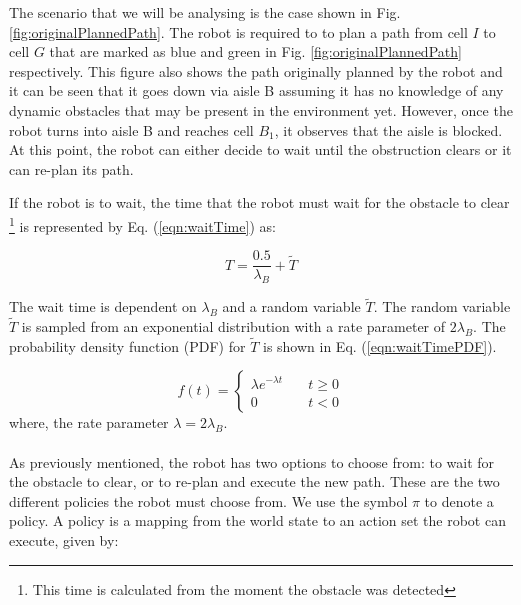 \documentclass[a4paper,12pt]{article}
\begin{document}
			The scenario that we will be analysing is the case shown in Fig. \ref{fig:originalPlannedPath}. The robot is required to to plan a path from cell $I$ to cell $G$ that are marked as blue and green in Fig. \ref{fig:originalPlannedPath} respectively. This figure also shows the path originally planned by the robot and it can be seen that it goes down via aisle B assuming it has no knowledge of any dynamic obstacles that may be present in the environment yet. However, once the robot turns into aisle B and reaches cell $ B_1 $, it observes that the aisle is blocked. At this point, the robot can either decide to wait until the obstruction clears or it can re-plan its path. 
			
			If the robot is to wait, the time that the robot must wait for the obstacle to clear \footnote{This time is calculated from the moment the obstacle was detected} is represented by Eq. (\ref{eqn:waitTime}) as: 
			
			\begin{equation}
			T=\frac{0.5}{\lambda_{B}}+\widetilde{T}
			\label{eqn:waitTime}
			\end{equation}
			
			The wait time is dependent on $\lambda_{B}$ and a random variable $\widetilde{T}$. The random variable $\widetilde{T}$ is sampled from an exponential distribution with a rate parameter of $2\lambda_{B}$. The probability density function (PDF) for $\widetilde{T}$ is shown in Eq. (\ref{eqn:waitTimePDF}). 
			
			\begin{equation}
			f(t) = 
			\begin{cases}
			\lambda e^{-\lambda t} & \quad t \geq 0 \\
			0 & \quad t < 0
			\end{cases}
			\label{eqn:waitTimePDF}
			\end{equation}
			where, the rate parameter $\lambda = 2\lambda_{B}$. 
			\\
			\\
			As previously mentioned, the robot has two options to choose from: to wait for the obstacle to clear, or to re-plan and execute the new path. These are the two different policies the robot must choose from. We use the symbol $\pi$ to denote a policy. A policy is a mapping from the world state to an action set the robot can execute, given by:
			
\end{document}
